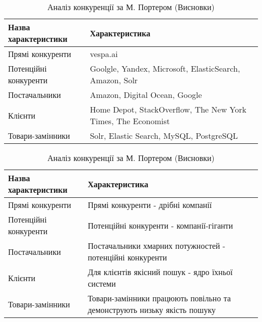 \begin{table}
	\begin{tabular}
		{|l|p{10cm}|} \hline
		\bf{Назва характеристики} & \bf{Характеристика} \\ \hline
		Прямі конкуренти & vespa.ai \\ \hline
		Потенційні конкуренти & Goolgle, Yandex, Microsoft, ElasticSearch, Amazon, Solr \\ \hline
		Постачальники & Amazon, Digital Ocean, Google \\ \hline
		Клієнти & Home Depot, StackOverflow, The New York Times, The Economist \\ \hline
		Товари-замінники & Solr, Elastic Search, MySQL, PostgreSQL \\ \hline
	\end{tabular}
	\caption{Аналіз конкуренції за М. Портером (Складові аналізу)}
	\begin{tabular}
		{|l|p{10cm}|} \hline
		\bf{Назва характеристики} & \bf{Характеристика} \\ \hline
		Прямі конкуренти & Прямі конкуренти - дрібні компанії \\ \hline
		Потенційні конкуренти & Потенційні конкуренти - компанії-гіганти \\ \hline
		Постачальники & Постачальники хмарних потужностей - потенційні конкуренти\\ \hline
		Клієнти & Для клієнтів якісний пошук - ядро їхньої системи \\ \hline
		Товари-замінники & Товари-замінники працюють повільно та демонструють низьку якість пошуку \\ \hline
	\end{tabular}
	\caption{Аналіз конкуренції за М. Портером (Висновки)}
	
\end{table}

